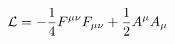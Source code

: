 \begin{equation}
 {\cal{L}}= -\frac{1}{4} F^{\mu\nu} F_{\mu\nu} + \frac{1}{2} A^\mu
 A_\mu
 \label{a36}
 \end{equation}

